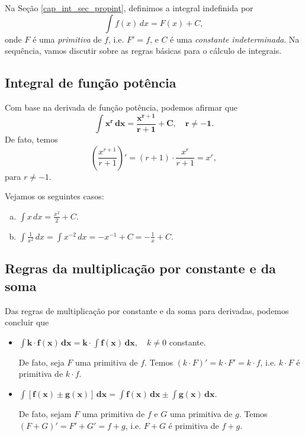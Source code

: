 Na Seção \ref{cap_int_sec_propint}, definimos a integral indefinida por
\begin{equation}
  \int f(x)\,dx = F(x) + C,
\end{equation}
onde $F$ é uma \emph{primitiva} de $f$, i.e. $F' = f$, e $C$ é uma \emph{constante indeterminada}. Na sequência, vamos discutir sobre as regras básicas para o cálculo de integrais.

\subsection{Integral de função potência}

Com base na derivada de função potência, podemos afirmar que
\begin{equation}
  \pmb{\int x^r\,dx = \frac{x^{r+1}}{r+1} + C,\quad r\neq -1}.
\end{equation}
De fato, temos
\begin{equation}
  \left(\frac{x^{r+1}}{r+1}\right)' = (r+1)\cdot \frac{x^r}{r+1} = x^r,
\end{equation}
para $r\neq -1$.

\begin{ex}
  Vejamos os seguintes casos:
  \begin{enumerate}[a)]
  \item $\displaystyle \int x\,dx = \frac{x^2}{2} + C$.
  \item $\displaystyle \int \frac{1}{x^2}\,dx = \int x^{-2}\,dx = -x^{-1} + C = -\frac{1}{x}+C$.
  \end{enumerate}
\end{ex}

\subsection{Regras da multiplicação por constante e da soma}

Das regras de multiplicação por constante e da soma para derivadas, podemos concluir que
\begin{itemize}
\item $\displaystyle \pmb{\int k\cdot f(x)\,dx = k\cdot \int f(x)\,dx},\quad k\neq 0$ constante.

  De fato, seja $F$ uma primitiva de $f$. Temos $(k\cdot F)' = k\cdot F' = k\cdot f$, i.e. $k\cdot F$ é primitiva de $k\cdot f$.
  
\item $\displaystyle \pmb{\int \left[f(x)\pm g(x)\right]\,dx = \int f(x)\,dx \pm \int g(x)\,dx}$.

  De fato, sejam $F$ uma primitiva de $f$ e $G$ uma primitiva de $g$. Temos $(F + G)' = F' + G' = f + g$, i.e. $F + G$ é primitiva de $f+g$.
\end{itemize}

